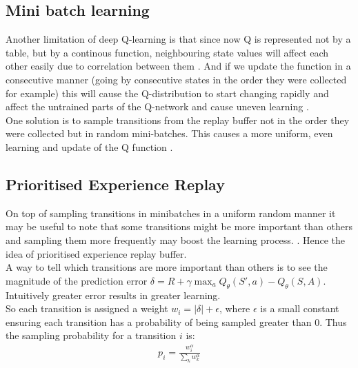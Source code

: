 \subsection{Mini batch learning }

Another limitation of deep Q-learning is that since now Q is represented not by a table, but by a continous function, neighbouring state values will affect each other easily due to correlation between them \cite{lecture_dqn} . And if 
we update the function in a consecutive manner (going by consecutive states in the order they were collected for example) this will cause the  Q-distribution to start changing rapidly and affect the untrained parts of the Q-network and cause uneven learning \cite{lecture_dqn}. \\

One solution is to sample transitions from the replay buffer not in the order they were collected but in random mini-batches\cite{lecture_dqn}. This causes a more uniform, even learning and update of the Q function \cite{lecture_dqn}.  


\subsection{Prioritised Experience Replay}

On top of sampling transitions in minibatches in a uniform random manner it may be useful to note that some transitions might be more important than others and sampling them more frequently may boost the learning process. \cite{lecture_dqn}. Hence the idea of prioritised experience replay buffer. \\

A way to tell which transitions are more important than others is to see the magnitude of the prediction error $\delta = R + \gamma \max_a Q_{\theta}(S', a) - Q_{\theta}(S, A)$. 
Intuitively greater error results in greater learning.\\

So each transition is assigned a weight $w_i = |\delta| + \epsilon$, where $\epsilon$ is a small constant ensuring each transition has a probability of being sampled greater than 0. Thus the sampling probability for a transition $i$ is:
\begin{align}
    p_i = \frac{w_i^{\alpha}}{\sum_k w^{\alpha}_k}
\end{align}


